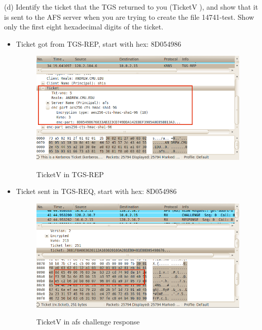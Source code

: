 \documentclass[12pt]{article}  %
\begin{document}
(d) Identify the ticket that the TGS returned to you (TicketV ), and show that it is sent to the AFS server when you are trying to create the file 14741-test. Show only the first eight hexadecimal digits of the ticket.\\
\begin{itemize}
  \setlength{\itemsep}{1pt}
  \setlength{\parskip}{0pt}
  \setlength{\parsep}{0pt}
  
\item Ticket got from TGS-REP, start with hex: 8D054986
\begin{figure}[h]
\centering
  \includegraphics[scale=0.5]{TGS-REP-TICKET.png}\\
 \caption{TicketV in TGS-REP}
 \end{figure}
 
 \item Ticket sent in TGS-REQ, start with hex: 8D054986
\begin{figure}[h]
\centering
  \includegraphics[scale=0.5]{AFS-TICKET.png}\\
 \caption{TicketV in afs challenge response}
 \end{figure}
  
 \end{itemize}
\medskip
\end{document}
